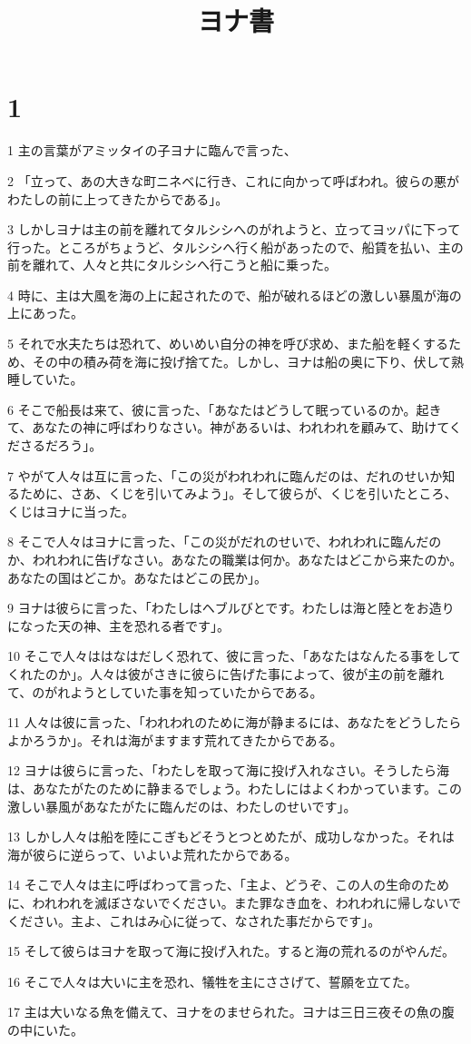 

\title{ヨナ書}


\chapter{1}

\par 1 主の言葉がアミッタイの子ヨナに臨んで言った、
\par 2 「立って、あの大きな町ニネベに行き、これに向かって呼ばわれ。彼らの悪がわたしの前に上ってきたからである」。
\par 3 しかしヨナは主の前を離れてタルシシへのがれようと、立ってヨッパに下って行った。ところがちょうど、タルシシへ行く船があったので、船賃を払い、主の前を離れて、人々と共にタルシシへ行こうと船に乗った。
\par 4 時に、主は大風を海の上に起されたので、船が破れるほどの激しい暴風が海の上にあった。
\par 5 それで水夫たちは恐れて、めいめい自分の神を呼び求め、また船を軽くするため、その中の積み荷を海に投げ捨てた。しかし、ヨナは船の奥に下り、伏して熟睡していた。
\par 6 そこで船長は来て、彼に言った、「あなたはどうして眠っているのか。起きて、あなたの神に呼ばわりなさい。神があるいは、われわれを顧みて、助けてくださるだろう」。
\par 7 やがて人々は互に言った、「この災がわれわれに臨んだのは、だれのせいか知るために、さあ、くじを引いてみよう」。そして彼らが、くじを引いたところ、くじはヨナに当った。
\par 8 そこで人々はヨナに言った、「この災がだれのせいで、われわれに臨んだのか、われわれに告げなさい。あなたの職業は何か。あなたはどこから来たのか。あなたの国はどこか。あなたはどこの民か」。
\par 9 ヨナは彼らに言った、「わたしはヘブルびとです。わたしは海と陸とをお造りになった天の神、主を恐れる者です」。
\par 10 そこで人々ははなはだしく恐れて、彼に言った、「あなたはなんたる事をしてくれたのか」。人々は彼がさきに彼らに告げた事によって、彼が主の前を離れて、のがれようとしていた事を知っていたからである。
\par 11 人々は彼に言った、「われわれのために海が静まるには、あなたをどうしたらよかろうか」。それは海がますます荒れてきたからである。
\par 12 ヨナは彼らに言った、「わたしを取って海に投げ入れなさい。そうしたら海は、あなたがたのために静まるでしょう。わたしにはよくわかっています。この激しい暴風があなたがたに臨んだのは、わたしのせいです」。
\par 13 しかし人々は船を陸にこぎもどそうとつとめたが、成功しなかった。それは海が彼らに逆らって、いよいよ荒れたからである。
\par 14 そこで人々は主に呼ばわって言った、「主よ、どうぞ、この人の生命のために、われわれを滅ぼさないでください。また罪なき血を、われわれに帰しないでください。主よ、これはみ心に従って、なされた事だからです」。
\par 15 そして彼らはヨナを取って海に投げ入れた。すると海の荒れるのがやんだ。
\par 16 そこで人々は大いに主を恐れ、犠牲を主にささげて、誓願を立てた。
\par 17 主は大いなる魚を備えて、ヨナをのませられた。ヨナは三日三夜その魚の腹の中にいた。

